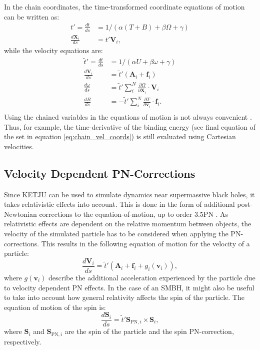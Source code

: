 \documentclass[english, twoside]{HYgradu}
\begin{document}
In the chain coordinates, the time-transformed coordinate equations of motion can be written as:
\begin{equation}
\begin{split}
t'= \frac{dt}{ds} &= 1/(\alpha(T+B) + \beta\Omega + \gamma) \\
\frac{d\mathbf{X}_i}{ds} &= t' \mathbf{V}_i,
\end{split}
\end{equation}
while the velocity equations are:
\begin{equation}
\begin{split}
\tilde{t}' = \frac{dt}{ds} &= 1/(\alpha U + \beta\omega + \gamma) \\
\frac{d\mathbf{V}_i}{ds} &= \tilde{t}' (\mathbf{A}_i + \mathbf{f}_i) \\
\frac{d\omega}{ds} &= \tilde{t}' \displaystyle\sum^N_i \frac{\partial \Omega}{\partial \mathbf{X}_i} \cdot \mathbf{V}_i \\
\frac{dB}{ds} &= -\tilde{t}' \displaystyle\sum^N_i \frac{\partial T}{\partial \mathbf{v}_i} \cdot \mathbf{f}_i. \\
\end{split} \label{eq:chain_vel_coords}
\end{equation}
Using the chained variables in the equations of motion is not always convenient \citep{Mikkola2008ARCHAIN}. Thus, for example, the time-derivative of the binding energy (see final equation of the set in equation \ref{eq:chain_vel_coords}) is still evaluated using Cartesian velocities.

\subsection{Velocity Dependent PN-Corrections}

Since KETJU can be used to simulate dynamics near supermassive black holes, it takes relativistic effects into account. This is done in the form of additional post-Newtonian corrections to the equation-of-motion, up to order 3.5PN  \citep{Rantala2017KETJU}. As relativistic effects are dependent on the relative momentum between objects, the velocity of the simulated particle has to be considered when applying the PN-corrections. This results in the following equation of motion for the velocity of a particle:
\begin{equation}
\frac{d\mathbf{V}_i}{ds} = \tilde{t}' (\mathbf{A}_i + \mathbf{f}_i + g_i(\mathbf{v}_i)), \label{eq:velocity_eom_pn}
\end{equation}
where $g(\mathbf{v}_i)$ describe the additional acceleration experienced by the particle due to velocity dependent PN effects. In the case of an SMBH, it might also be useful to take into account how general relativity affects the spin of the particle. The equation of motion of the spin is: 
\begin{equation}
\frac{d\mathbf{S}_i}{ds} = \tilde{t}' \mathbf{S}_{\mathrm{PN},i} \times \mathbf{S}_i, \label{eq:spin_eom_pn}
\end{equation}
where $\mathbf{S}_i$ and $\mathbf{S}_{\mathrm{PN},i}$ are the spin of the particle and the spin PN-correction, respectively.
\end{document}

